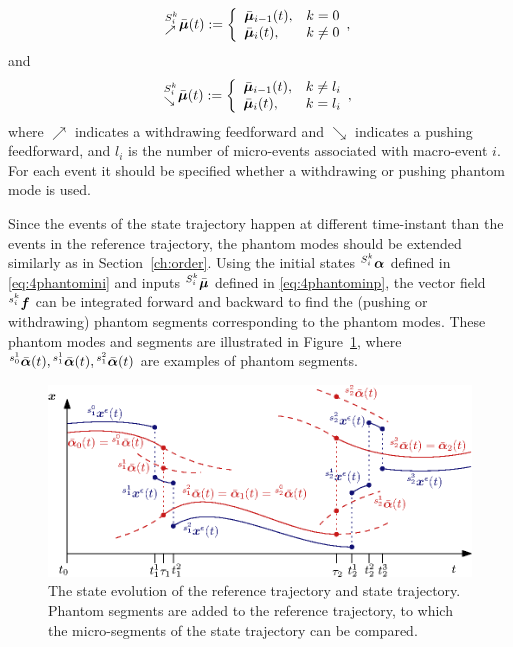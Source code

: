 \documentclass[../DC2017114Bouma.tex]{subfiles}
\begin{document}
\begin{equation}
\hspace{0cm}^{S^k_i}_{\nearrow}\bar{\boldsymbol{\mu}}(t) := \left\lbrace\begin{array}{ll}
\bar{\boldsymbol{\mu}}_{i-1}(t), & k = 0\\
\bar{\boldsymbol{\mu}}_i(t), & k \neq 0
\end{array},\right.
\end{equation}
and
\begin{equation}
\hspace{0cm}^{S^k_i}_{\searrow}\bar{\boldsymbol{\mu}}(t) := \left\lbrace\begin{array}{ll}
\bar{\boldsymbol{\mu}}_{i-1}(t), & k \neq l_i\\
\bar{\boldsymbol{\mu}}_i(t), & k = l_i
\end{array},\right.\label{eq:4phantominp}
\end{equation}
%
where $\nearrow$ indicates a withdrawing feedforward and $\searrow$ indicates a pushing feedforward, and $l_i$ is the number of micro-events associated with macro-event $i$. For each event it should be specified whether a withdrawing or pushing phantom mode is used. 

Since the events of the state trajectory happen at different time-instant than the events in the reference trajectory, the phantom modes should be extended similarly as in Section~\ref{ch:order}. 
Using the initial states $\hspace{0cm}^{S_i^{k}}\boldsymbol{\alpha}$ defined in \eqref{eq:4phantomini} and inputs $\hspace{0cm}^{S^k_i}\bar{\boldsymbol{\mu}}$ defined in \eqref{eq:4phantominp}, the vector field $\hspace{0cm}^{s^k_i}{\boldsymbol{f}}$ can be integrated forward and backward to find the (pushing or withdrawing) phantom segments corresponding to the phantom modes. These phantom modes and segments are illustrated in Figure~\ref{fig:4simulmicro}, where $\hspace{0cm}^{s_0^1}\bar{\boldsymbol{\alpha}}(t),\hspace{0cm}^{s_1^1}\bar{\boldsymbol{\alpha}}(t),\hspace{0cm}^{s_1^2}\bar{\boldsymbol{\alpha}}(t)$ are examples of phantom segments.
\begin{figure}[h]
\centering
\includegraphics[width=.9\textwidth]{simulmicro.eps}\caption{The state evolution of the reference trajectory and state trajectory. Phantom segments are added to the reference trajectory, to which the micro-segments of the state trajectory can be compared.}\label{fig:4simulmicro}
\end{figure}
\end{document}
